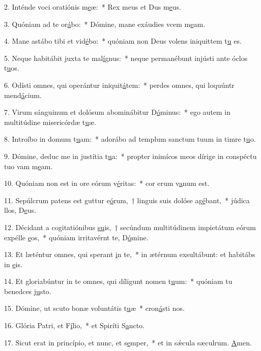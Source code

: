 2. Inténde voci oratiónis m\uline{e}æ:~* Rex meus et Dus m\uline{e}us.\par 
3. Quóniam ad te or\uline{á}bo:~* Dómine, mane exáudies vcem m\uline{e}am.\par 
4. Mane astábo tibi et vid\uline{é}bo:~* quóniam non Deus volens iniquittem t\uline{u} es.\par 
5. Neque habitábit juxta te mal\uline{í}gnus:~* neque permanébunt injústi ante óclos t\uline{u}os.\par 
6. Odísti omnes, qui operántur iniquit\uline{á}tem:~* perdes omnes, qui loquúntr mend\uline{á}cium.\par 
7. Virum sánguinum et dolósum abominábitur D\uline{ó}minus:~* ego autem in multitúdine misericórdæ t\uline{u}æ.\par 
8. Introíbo in domum t\uline{u}am:~* adorábo ad templum sanctum tuum in timre t\uline{u}o.\par 
9. Dómine, deduc me in justítia t\uline{u}a:~* propter inimícos meos dírige in conspéctu tuo vam m\uline{e}am.\par 
10. Quóniam non est in ore eórum v\uline{é}ritas:~* cor erum v\uline{a}num est.\par 
11. Sepúlcrum patens est guttur e\uline{ó}rum,~† linguis suis dolóse ag\uline{é}bant,~* júdica llos, D\uline{e}us.\par 
12. Décidant a cogitatiónibus \uline{su}is,~† secúndum multitúdinem impietátum eórum expélle \uline{e}os,~* quóniam irritavérnt te, D\uline{ó}mine.\par 
13. Et læténtur omnes, qui sperant \uline{i}n te,~* in ætérnum exsultábunt: et habitábs in \uline{e}is.\par 
14. Et gloriabúntur in te omnes, qui díligunt nomen t\uline{u}um:~* quóniam tu benedces j\uline{u}sto.\par 
15. Dómine, ut scuto bonæ voluntátis t\uline{u}æ~* cron\uline{á}sti nos.\par 
16. Glória Patri, et F\uline{í}lio,~* et Spiríti S\uline{a}ncto.\par 
17. Sicut erat in princípio, et nunc, et s\uline{e}mper,~* et in sǽcula sæculrum. \uline{A}men.\par 
